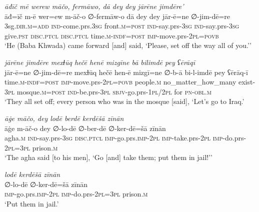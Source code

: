 \ea \label{BP.86}
\textit{āđīč mē werew māčo, fermāwo, dā dey dey jārēne jimdēre’} \\ 
\gll āđ=īč m-ē wer=ew m-āč-o ∅-fermāw-o dā dey dey jār-ē=ne ∅-jim-dē=re \\ 
 3sg\textsc{.dir}\textsc{.m}\textsc{=add} \textsc{ind-}come.prs\textsc{.3sg} front\textsc{.m}\textsc{=\textsc{post}} \textsc{ind-}say.prs\textsc{-3sg} \textsc{ind-}say.prs\textsc{-3sg} give\textsc{.pst} \textsc{disc.ptcl} \textsc{disc.ptcl} time\textsc{.m}\textsc{-indf}\textsc{=\textsc{post}} \textsc{imp-}move.prs-\textsc{2pl}\textsc{=\textsc{povb}} \\ 
\glt `He (Baba Khwada) came forward [and] said, ‘Please, set off the way all of you.’'
\z 
 
\ea \label{BP.87}
\textit{jārēne jimdēre mexɫūq hečē henē mizgīne bā bilimdē pey ʕērāqī} \\ 
\gll jār-ē=ne ∅-jim-dē=re mexɫūq hečē hen-ē mizgī=ne ∅-b-ā bi-l-imdē pey ʕērāq-ī \\ 
 time\textsc{.m}\textsc{-indf}\textsc{=\textsc{post}} \textsc{imp-}move.prs-\textsc{2pl}\textsc{=\textsc{povb}} people\textsc{.m} no\_matter\_how\_many exist\textsc{-3pl} mosque\textsc{.m}\textsc{=\textsc{post}} \textsc{ind-}be.prs\textsc{-3pl} \textsc{sbjv-}go.prs\textsc{-\textsc{1pl}}/\textsc{2pl} for \textsc{pn}\textsc{-obl}\textsc{.m} \\ 
\glt `They all set off; every person who was in the mosque [said], ‘Let’s go to Iraq.'
\z 
 
\ea \label{BP.129}
\textit{āġe māčo, dey lodē berdē kerdēšā zīnān} \\ 
\gll āġe m-āč-o dey ∅-lo-dē ∅-ber-dē ∅-ker-dē=šā zīnān \\ 
 agha\textsc{.m} \textsc{ind-}say.prs\textsc{-3sg} \textsc{disc.ptcl} \textsc{imp-}go.prs.\textsc{imp-}\textsc{2pl} \textsc{imp-}take.prs-\textsc{2pl} \textsc{imp-}do.prs-\textsc{2pl}\textsc{=3pl} prison\textsc{.m} \\ 
\glt `The agha said [to his men], ‘Go [and] take them; put them in jail!’'
\z 
 
\ea \label{BP.130}
\textit{lodē kerdēšā zīnān} \\ 
\gll ∅-lo-dē ∅-ker-dē=šā zīnān \\ 
 \textsc{imp-}go.prs.\textsc{imp-}\textsc{2pl} \textsc{imp-}do.prs-\textsc{2pl}\textsc{=3pl} prison\textsc{.m} \\ 
\glt `Put them in jail.'
\z 
 
